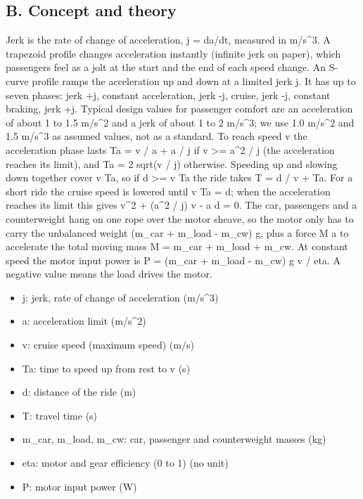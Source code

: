 \documentclass[11pt,a4paper]{article}
\begin{document}
\subsection*{B. Concept and theory}
Jerk is the rate of change of acceleration, j = da/dt, measured in m/s\textasciicircum{}3. A trapezoid profile changes acceleration instantly (infinite jerk on paper), which passengers feel as a jolt at the start and the end of each speed change. An S-curve profile ramps the acceleration up and down at a limited jerk j. It has up to seven phases: jerk +j, constant acceleration, jerk -j, cruise, jerk -j, constant braking, jerk +j. Typical design values for passenger comfort are an acceleration of about 1 to 1.5 m/s\textasciicircum{}2 and a jerk of about 1 to 2 m/s\textasciicircum{}3; we use 1.0 m/s\textasciicircum{}2 and 1.5 m/s\textasciicircum{}3 as assumed values, not as a standard. To reach speed v the acceleration phase lasts Ta = v / a + a / j if v \textgreater{}= a\textasciicircum{}2 / j (the acceleration reaches its limit), and Ta = 2 sqrt(v / j) otherwise. Speeding up and slowing down together cover v Ta, so if d \textgreater{}= v Ta the ride takes T = d / v + Ta. For a short ride the cruise speed is lowered until v Ta = d; when the acceleration reaches its limit this gives v\textasciicircum{}2 + (a\textasciicircum{}2 / j) v - a d = 0. The car, passengers and a counterweight hang on one rope over the motor sheave, so the motor only has to carry the unbalanced weight (m\_car + m\_load - m\_cw) g, plus a force M a to accelerate the total moving mass M = m\_car + m\_load + m\_cw. At constant speed the motor input power is P = (m\_car + m\_load - m\_cw) g v / eta. A negative value means the load drives the motor.

\begin{itemize}[nosep]
\item j: jerk, rate of change of acceleration (m/s\textasciicircum{}3)
\item a: acceleration limit (m/s\textasciicircum{}2)
\item v: cruise speed (maximum speed) (m/s)
\item Ta: time to speed up from rest to v (s)
\item d: distance of the ride (m)
\item T: travel time (s)
\item m\_car, m\_load, m\_cw: car, passenger and counterweight masses (kg)
\item eta: motor and gear efficiency (0 to 1) (no unit)
\item P: motor input power (W)
\end{itemize}
\end{document}
